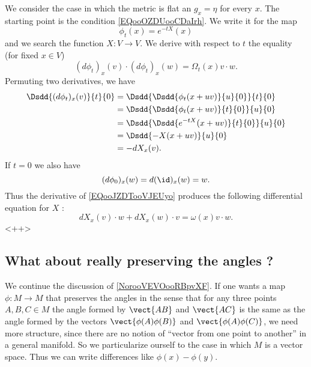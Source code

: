 We consider the case in which the metric is flat an \( g_x=\eta\) for every \( x\).  The starting point is the condition \eqref{EQooOZDUooCDaIrh}. We write it for the map
\begin{equation}
    \phi_t(x)= e^{-tX}(x)
\end{equation}
and we search the function \( X\colon V\to V\). We derive with respect to \( t\) the equality (for fixed \( x\in V\))
\begin{equation}        \label{EQooJZDTooVJEUyo}
    (d\phi_t)_x(v)\cdot (d\phi_t)_x(w)=\Omega_t(x)v\cdot w.
\end{equation}
Permuting two derivatives, we have
\begin{subequations}
    \begin{align}
        \Dsdd{ (d\phi_t)_x(v) }{t}{0}&=\Dsdd{ \Dsdd{   \phi_t(x+uv)  }{u}{0} }{t}{0}\\
        &=\Dsdd{\Dsdd{ \phi_t(x+uv) }{t}{0} }{u}{0}\\
        &=\Dsdd{ \Dsdd{  e^{-tX}(x+uv) }{t}{0} }{u}{0}\\
        &=\Dsdd{ -X(x+uv) }{u}{0}\\
        &=-dX_x(v).
    \end{align}
\end{subequations}
If \( t=0\) we also have
\begin{equation}
    (d\phi_0)_x(w)=d(\id)_x(w)=w.
\end{equation}
Thus the derivative of \eqref{EQooJZDTooVJEUyo} produces the following differential equation for \( X\) :
\begin{equation}
    dX_x(v)\cdot w+dX_x(w)\cdot v=\omega(x)v\cdot w.
\end{equation}
<++>


\subsection{What about really preserving the angles ?}
\label{sebsecooCBKEooQOWqFo}

We continue the discussion of \ref{NorooVEVOooRBpvXF}. If one wants a map \( \phi\colon M\to M\) that preserves the angles in the sense that for any three points \( A,B,C\in M\) the angle formed by \( \vect{ AB }\) and \( \vect{ AC }\) is the same as the angle formed by the vectors \( \vect{ \phi(A)\phi(B) }\) and \( \vect{ \phi(A)\phi(C) }\), we need more structure, since there are no notion of ``vector from one point to another'' in a general manifold. So we particularize ourself to the case in which \( M\) is a vector space. Thus we can write differences like \( \phi(x)-\phi(y)\).

